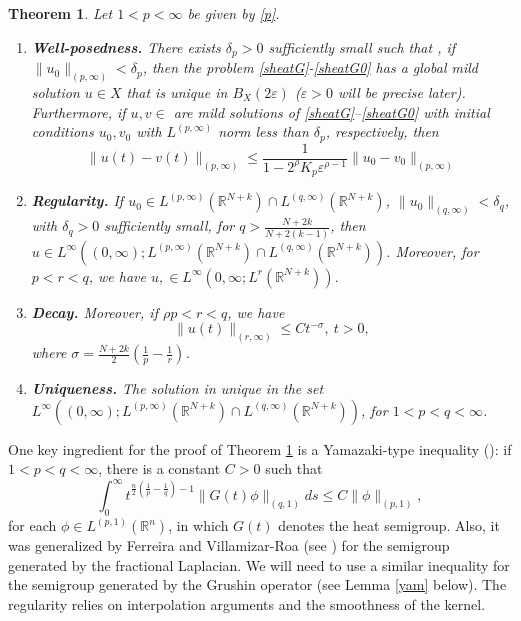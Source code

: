 \documentclass[12pt]{amsart}
\newtheorem{theorem}{Theorem}[section]
\newcommand{\R}{\mathbb{R}}
\begin{document}
\begin{theorem}\label{globale}
	Let $1<p<\infty$ be given by \eqref{p}.
	\begin{enumerate}
		\item[(a)] \textbf{Well-posedness.} There exists $\delta_p>0$ sufficiently small such that , if $\|u_0\|_{(p,\infty)}<\delta_p$, then  the problem \eqref{sheatG}-\eqref{sheatG0} has a global mild solution $u \in X$ that is unique in $B_X(2\varepsilon)$ ($\varepsilon>0$ will be precise later). Furthermore, if $u,v\in$ are mild solutions of \eqref{sheatG}--\eqref{sheatG0} with initial conditions $u_0, v_0$ with $L^{(p,\infty)}$ norm less than $\delta_p$, respectively, then 
		\begin{equation}\label{contdep}
			\|u(t) - v(t)\|_{(p,\infty)} \leq \frac{1}{1-2^\rho K_p \varepsilon^{\rho-1}} \|u_0 - v_0\|_{(p,\infty)} 
		\end{equation}
		
		\item[(b)] \textbf{Regularity.} If $u_0\in L^{(p,\infty)}(\R^{N+k}) \cap L^{(q,\infty)}(\R^{N+k})$, $\|u_0\|_{(q,\infty)}<\delta_q$, with $\delta_q>0$ sufficiently small, for $q>\frac{N+2k}{N+2(k-1)}$, then $u \in L^\infty((0,\infty); L^{(p,\infty)}(\R^{N+k}) \cap L^{(q,\infty)}(\R^{N+k}))$. Moreover, for $p<r<q$, we have $u, \in L^\infty(0,\infty;L^r(\R^{N+k}))$.
		
		\item[(c)] \textbf{Decay.} Moreover, if $\rho p < r< q$, we have
		\begin{equation}\label{decay}
			\|u(t)\|_{(r,\infty)}\leq C t^{-\sigma}, \ t>0 ,
		\end{equation} 
		where $\sigma=\frac{N+2k}{2}\left(\frac{1}{p}-\frac{1}{r}\right)$.
		\item[(d)] \textbf{Uniqueness.} The solution in unique in the set $L^\infty((0,\infty); L^{(p,\infty)}(\R^{N+k}) \cap L^{(q,\infty)}(\R^{N+k}))$, for $1<p<q<\infty$.
	\end{enumerate}
\end{theorem}

One key ingredient for the proof of Theorem \ref{globale} is a Yamazaki-type inequality (\cite{Yamazaki}): if $1<p<q<\infty$, there is a constant $C>0$ such that
\begin{equation}
	\int^{\infty}_0t^{\frac{n}{2}\left(\frac{1}{p}-\frac{1}{q}\right)-1}\|G(t)\phi\|_{(q,1)}ds\leq C\|\phi\|_{(p,1)}, 
\end{equation}
for each $\phi \in L^{(p,1)}(\mathbb{R}^n)$, in which $G(t)$ denotes the heat semigroup. Also, it was generalized by Ferreira and Villamizar-Roa (see \cite{FVR}) for the semigroup generated by the fractional Laplacian. We will need to use a similar inequality for the semigroup generated by the Grushin operator (see Lemma \ref{yam} below). The regularity relies on interpolation arguments and the smoothness of the kernel. 
\end{document}
